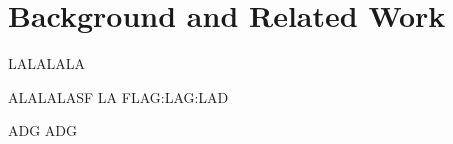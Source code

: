 \chapter{Background and Related Work \label{chap:background}}

LALALALA

ALALALASF
LA
FLAG:LAG:LAD

ADG
ADG
